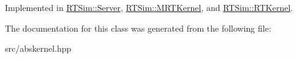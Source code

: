 Implemented in \hyperlink{classRTSim_1_1Server_a331017a70b4fdd53aed45bbd96726a08}{R\+T\+Sim\+::\+Server}, \hyperlink{classRTSim_1_1MRTKernel_a016ed93346f3505e11389cb8a8cdc777}{R\+T\+Sim\+::\+M\+R\+T\+Kernel}, and \hyperlink{classRTSim_1_1RTKernel_a9cc3e67f5f9ca883246d024d071a13b1}{R\+T\+Sim\+::\+R\+T\+Kernel}.



The documentation for this class was generated from the following file\+:\begin{DoxyCompactItemize}
\item 
src/abskernel.\+hpp\end{DoxyCompactItemize}
